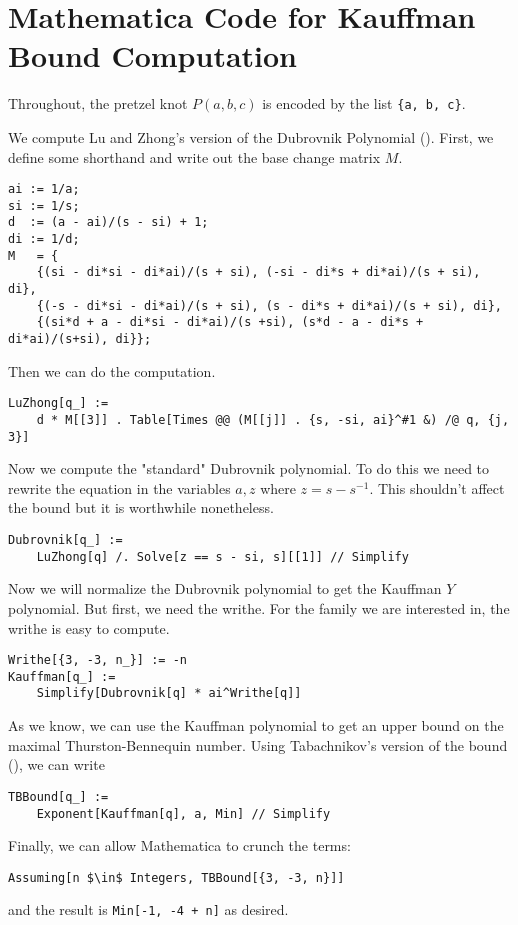 \chapter{Mathematica Code for Kauffman Bound Computation}\label{chap:appendix}

\lstset{language=Mathematica,style=better}
Throughout, the pretzel knot $P(a, b, c)$ is encoded by the list \lstinline|{a, b, c}|.

We compute Lu and Zhong's version of the Dubrovnik Polynomial (\cite{lu-zhong}).
First, we define some shorthand and write out the base change matrix $M$.
\begin{lstlisting}
ai := 1/a;
si := 1/s;
d  := (a - ai)/(s - si) + 1;
di := 1/d;
M   = {
    {(si - di*si - di*ai)/(s + si), (-si - di*s + di*ai)/(s + si), di},
    {(-s - di*si - di*ai)/(s + si), (s - di*s + di*ai)/(s + si), di},
    {(si*d + a - di*si - di*ai)/(s +si), (s*d - a - di*s + di*ai)/(s+si), di}};
\end{lstlisting}

Then we can do the computation. 
\begin{lstlisting}
LuZhong[q_] :=
    d * M[[3]] . Table[Times @@ (M[[j]] . {s, -si, ai}^#1 &) /@ q, {j, 3}]
\end{lstlisting}

Now we compute the "standard" Dubrovnik polynomial. To do this we need to rewrite the equation in the variables $a, z$ where $z = s - s^{-1}$. This shouldn't affect the bound but it is worthwhile nonetheless.

\begin{lstlisting}
Dubrovnik[q_] :=
 	LuZhong[q] /. Solve[z == s - si, s][[1]] // Simplify
\end{lstlisting}

Now we will normalize the Dubrovnik polynomial to get the Kauffman $Y$ polynomial. But first, we need the writhe. For the family we are interested in, the writhe is easy to compute.

\begin{lstlisting}
Writhe[{3, -3, n_}] := -n
Kauffman[q_] :=
    Simplify[Dubrovnik[q] * ai^Writhe[q]]
\end{lstlisting}

As we know, we can use the Kauffman polynomial to get an upper bound on the maximal Thurston-Bennequin number. Using Tabachnikov's version of the bound (\cite{tabachnikov}), we can write

\begin{lstlisting}
TBBound[q_] :=
    Exponent[Kauffman[q], a, Min] // Simplify
\end{lstlisting}

Finally, we can allow Mathematica to crunch the terms:
\begin{lstlisting}[mathescape]
Assuming[n $\in$ Integers, TBBound[{3, -3, n}]]
\end{lstlisting}
and the result is \lstinline|Min[-1, -4 + n]| as desired.
